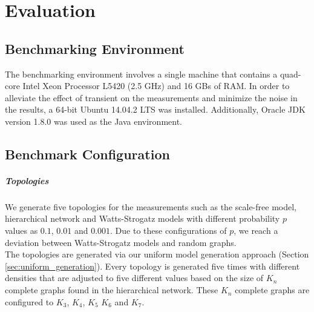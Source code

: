 
\chapter{Evaluation}\label{chapter:evaluation}



\section{Benchmarking Environment}

The benchmarking environment involves a single machine that contains a quad-core Intel Xeon Processor L5420 (2.5 GHz) and 16 GBs of RAM. In order to alleviate the effect of transient on the measurements and minimize the noise in the results, a 64-bit Ubuntu 14.04.2 LTS was installed. Additionally, Oracle JDK version 1.8.0 was used as the Java environment.


\section{Benchmark Configuration}

\paragraph{Topologies}

We generate five topologies for the measurements such as the scale-free model, hierarchical network and Watts-Strogatz models with different probability $p$ values as $0.1$, $0.01$ and $0.001$. Due to these configurations of $p$, we reach a deviation between Watts-Strogatz models and random graphs.\\ The topologies are generated via our uniform model generation approach (Section \ref{sec:uniform_generation}).
Every topology is generated five times with different densities that are adjusted to five different values based on the size of $K_n$ complete graphs found in the hierarchical network. These $K_n$ complete graphs are configured to $K_3$, $K_4$, $K_5$ $K_6$ and $K_7$.

